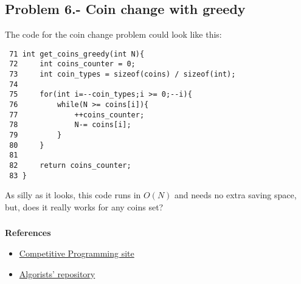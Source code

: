 \documentclass[article]{beamer}
\begin{document}
\subsection{Problem 6.- Coin change with greedy}
\begin{frame}[fragile]
	The code for the coin change problem could look like this:
	{\tiny
		\begin{lstlisting}
 71 int get_coins_greedy(int N){
 72     int coins_counter = 0;
 73     int coin_types = sizeof(coins) / sizeof(int);
 74 
 75     for(int i=--coin_types;i >= 0;--i){
 76         while(N >= coins[i]){
 77             ++coins_counter;
 78             N-= coins[i];
 79         }
 80     }
 81 
 82     return coins_counter;
 83 }
		\end{lstlisting}
	}
	
	As silly as it looks, this code runs in $O(N)$ and needs no extra saving space, but, does it really works for any coins set? 
\end{frame}

\begin{frame}[plain]
\frametitle{}
\begin{center}
\Huge{\color{blue}{Q \& A}}
\end{center}
\end{frame}

\begin{frame}[plain]
	\textbf{References}
	\begin{itemize}
		\item \href{https://sites.google.com/site/stevenhalim/}{Competitive Programming site}
		\item \href{https://github.com/davidjacobo/algorists/}{Algorists' repository}
	\end{itemize}
\end{frame}
\end{document}
